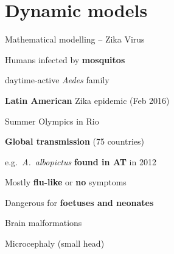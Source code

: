 \documentclass[table]{beamer}\usepackage[]{graphicx}\usepackage[]{color}
\begin{document}
\section{Dynamic models}
\begin{frame}[fragile]{Mathematical modelling -- Zika Virus} %

\begin{minipage}{.6\textwidth}
Humans infected by \textbf{mosquitos} \par
\hspace*{0.5cm} daytime-active \textit{Aedes} family \par
\vspace{0.3cm}
\textbf{Latin American} Zika epidemic (Feb 2016) \par
\vspace{0.1cm}
\hspace*{0.5cm} Summer Olympics in Rio \par %
\vspace{0.1cm}
\hspace*{0.5cm} \textbf{Global transmission} (75 countries) \par
\vspace{0.1cm}
\hspace*{0.5cm} e.g.\ \textit{A.\ albopictus} \textbf{found in AT} in 2012 \par
\vspace{0.3cm} 
Mostly \textbf{flu-like} or \textbf{no} symptoms \par
\vspace{0.3cm} 
Dangerous for \textbf{foetuses and neonates} \par
\vspace{0.1cm}
\hspace*{0.5cm} Brain malformations \par
\vspace{0.1cm}
\hspace*{0.5cm} Microcephaly (small head)


\end{minipage}
\end{frame}
\end{document}

